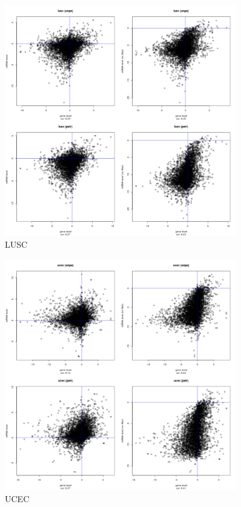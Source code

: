 \documentclass[a4paper,12pt]{article}
\begin{document}
\newpage

\begin{figure}[!h] 
\centering 
\includegraphics[width=0.9\textwidth]{plots/gene_vs_mirna_level_gsa_lusc.png} 
\caption{LUSC} 
\end{figure} 

\newpage

\begin{figure}[!h] 
\centering 
\includegraphics[width=0.9\textwidth]{plots/gene_vs_mirna_level_gsa_ucec.png} 
\caption{UCEC} 
\end{figure} 
\end{document}
